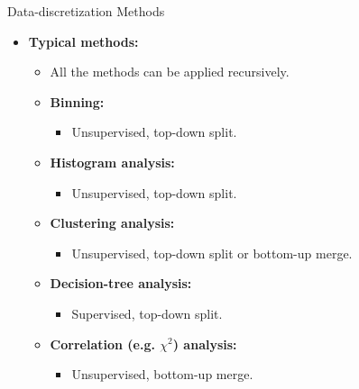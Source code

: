 \begin{frame}{Data-discretization Methods}
	\begin{itemize}
		\item \textbf{Typical methods:}
		\begin{itemize}
			\item All the methods can be applied recursively.
			\item \textbf{Binning:}
			\begin{itemize}
				\item Unsupervised, top-down split.
			\end{itemize}
			\item \textbf{Histogram analysis:}
			\begin{itemize}
				\item Unsupervised, top-down split.
			\end{itemize}
			\item \textbf{Clustering analysis:}
			\begin{itemize}
				\item Unsupervised, top-down split or bottom-up merge.
			\end{itemize}
			\item \textbf{Decision-tree analysis:}
			\begin{itemize}
				\item Supervised, top-down split.
			\end{itemize}
			\item \textbf{Correlation (e.g. $\chi^2$) analysis:}
			\begin{itemize}
				\item Unsupervised, bottom-up merge.
			\end{itemize}
		\end{itemize}
	\end{itemize}
\end{frame}

